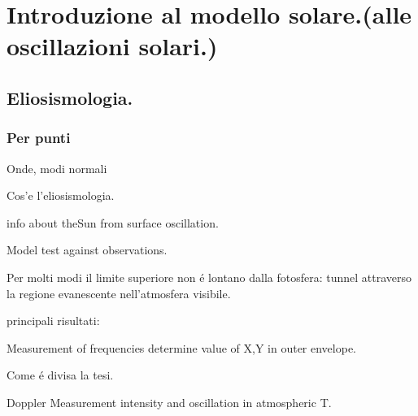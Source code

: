 \documentclass[../main.tex]{subfiles}
\begin{document}
\chapter{Introduzione al modello solare.(alle oscillazioni solari.)}
\PartialToc


\section{Eliosismologia.}

\subsection{Per punti}
\begin{itemize*}
\item Onde, modi normali
\item Cos'e l'eliosismologia.
\item info about theSun from surface oscillation.
\item Model test against observations.
\item Per molti modi il limite superiore non \'e lontano dalla fotosfera: tunnel attraverso la regione evanescente nell'atmosfera visibile.
\item principali risultati:
    \item Measurement of frequencies determine value of X,Y in outer envelope.
\item Come \'e divisa la tesi.



\item Doppler Measurement intensity and oscillation in atmospheric T.


\end{itemize*}
\end{document}
